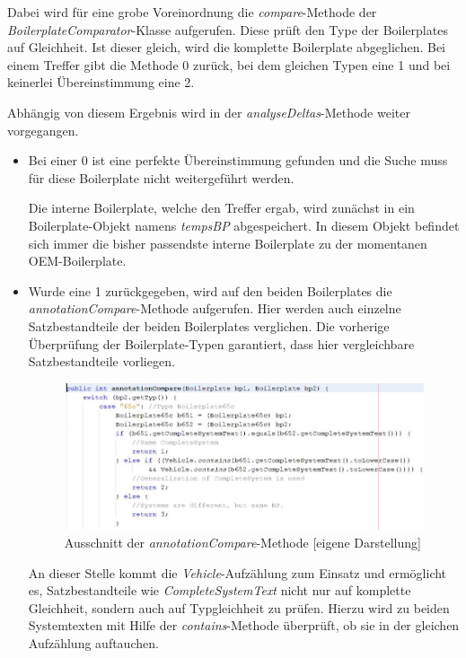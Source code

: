 \documentclass[12pt]{report}
\begin{document}
Dabei wird für eine grobe Voreinordnung die \textit{compare}-Methode der \textit{BoilerplateComparator}-Klasse aufgerufen. Diese prüft den Type der Boilerplates auf Gleichheit. Ist dieser gleich, wird die komplette Boilerplate abgeglichen. Bei einem Treffer gibt die Methode 0 zurück, bei dem gleichen Typen eine 1 und bei keinerlei Übereinstimmung eine 2. 

Abhängig von diesem Ergebnis wird in der \textit{analyseDeltas}-Methode weiter vorgegangen.

\begin{itemize}
\item
Bei einer 0 ist eine perfekte Übereinstimmung gefunden und die Suche muss für diese Boilerplate nicht weitergeführt werden.

Die interne Boilerplate, welche den Treffer ergab, wird zunächst in ein Boilerplate-Objekt namens \textit{tempsBP} abgespeichert. In diesem Objekt befindet sich immer die bisher passendste interne Boilerplate zu der momentanen OEM-Boilerplate. 

\item 
Wurde eine 1 zurückgegeben, wird auf den beiden Boilerplates die \textit{annotationCompare}-Methode aufgerufen. Hier werden auch einzelne Satzbestandteile der beiden Boilerplates verglichen. Die vorherige Überprüfung der Boilerplate-Typen garantiert, dass hier vergleichbare Satzbestandteile vorliegen. 

\begin{figure}[H]
\begin{center}
\includegraphics[scale=0.7]{Bilder/annotationCompare.jpg}
\caption{Ausschnitt der \textit{annotationCompare}-Methode [eigene Darstellung]}
\end{center}
\end{figure}

An dieser Stelle kommt die \textit{Vehicle}-Aufzählung zum Einsatz und ermöglicht es, Satzbestandteile wie \textit{CompleteSystemText} nicht nur auf komplette Gleichheit, sondern auch auf Typgleichheit zu prüfen. Hierzu wird zu beiden Systemtexten mit Hilfe der \textit{contains}-Methode überprüft, ob sie in der gleichen Aufzählung auftauchen. 


\end{itemize}
\end{document}
